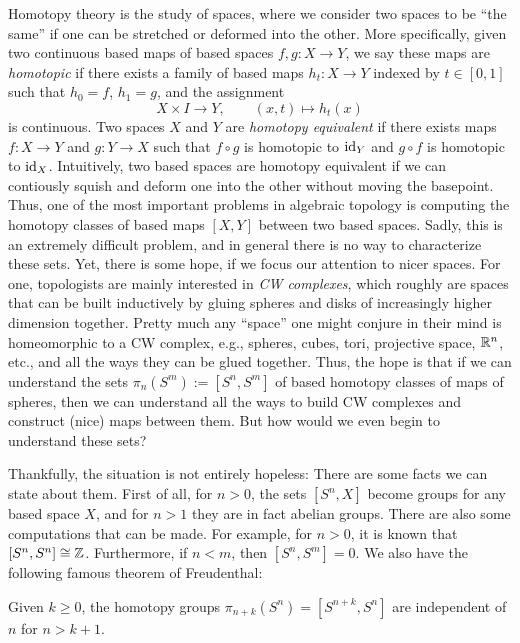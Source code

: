 \documentclass[../main.tex]{subfiles}
\begin{document}
Homotopy theory is the study of spaces, where we consider two spaces to be ``the same'' if one can be stretched or deformed into the other. More specifically, given two continuous based maps of based spaces $f,g:X\to Y$, we say these maps are \emph{homotopic} if there exists a family of based maps $h_t:X\to Y$ indexed by $t\in[0,1]$ such that $h_0=f$, $h_1=g$, and the assignment
\[X\times I\to Y,\qquad (x,t)\mapsto h_t(x)\]
is continuous. Two spaces $X$ and $Y$ are \emph{homotopy equivalent} if there exists maps $f:X\to Y$ and $g:Y\to X$ such that $f\circ g$ is homotopic to $\mathrm{id}_Y$ and $g\circ f$ is homotopic to $\mathrm{id}_X$. Intuitively, two based spaces are homotopy equivalent if we can contiously squish and deform one into the other without moving the basepoint. Thus, one of the most important problems in algebraic topology is computing the homotopy classes of based maps $[X,Y]$ between two based spaces. Sadly, this is an extremely difficult problem, and in general there is no way to characterize these sets. Yet, there is some hope, if we focus our attention to nicer spaces. For one, topologists are mainly interested in \emph{CW complexes}, which roughly are spaces that can be built inductively by gluing spheres and disks of increasingly higher dimension together. Pretty much any ``space'' one might conjure in their mind is homeomorphic to a CW complex, e.g., spheres, cubes, tori, projective space, $\mathbb{R}^n$, etc., and all the ways they can be glued together. Thus, the hope is that if we can understand the sets $\pi_n(S^m):=[S^n,S^m]$ of based homotopy classes of maps of spheres, then we can understand all the ways to build CW complexes and construct (nice) maps between them. But how would we even begin to understand these sets? 

Thankfully, the situation is not entirely hopeless: There are some facts we can state about them. First of all, for $n>0$, the sets $[S^n,X]$ become groups for any based space $X$, and for $n>1$ they are in fact abelian groups. There are also some computations that can be made. For example, for $n>0$, it is known that $[S^n,S^n]\cong\mathbb{Z}$. Furthermore, if $n<m$, then $[S^n,S^m]=0$. We also have the following famous theorem of Freudenthal:

\begin{theorem}
    Given $k\geq0$, the homotopy groups $\pi_{n+k}(S^n)=[S^{n+k},S^n]$ are independent of $n$ for $n>k+1$.
\end{theorem}
\end{document}
